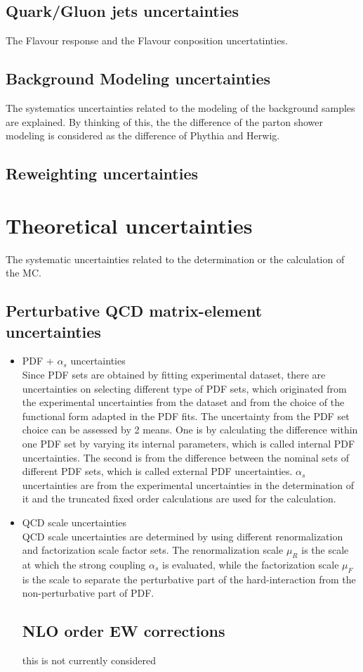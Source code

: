 \subsection{Quark/Gluon jets uncertainties}
The Flavour response and the Flavour conposition uncertatinties.
\subsection{Background Modeling uncertainties}
The systematics uncertainties related to the modeling of the background samples are explained.
By thinking of this, the the difference of the parton shower modeling is considered as the difference of Phythia and Herwig.
\subsection{Reweighting uncertainties}

\section{Theoretical uncertainties}
The systematic uncertainties related to the determination or the calculation of the MC.

\subsection{Perturbative QCD matrix-element uncertainties}
\begin{itemize}
\item PDF + $\alpha_s$ uncertainties\\
Since PDF sets are obtained by fitting experimental dataset, there are uncertainties on selecting different type of PDF sets, which originated from the experimental uncertainties from the dataset and from the choice of the functional form adapted in the PDF fits.
The uncertainty from the PDF set choice can be assessed by 2 means. One is by calculating the difference within one PDF set by varying its internal parameters, which is called internal PDF uncertainties. The second is from the difference between the nominal sets of different PDF sets, which is called external PDF uncertainties.
$\alpha_s$ uncertainties are from the experimental uncertainties in the determination of it and the truncated fixed order calculations are used for the calculation.
\item QCD scale uncertainties\\
QCD scale uncertainties are determined by using different renormalization and factorization scale factor sets. 
The renormalization scale $\mu_R$ is the scale at which the strong coupling $\alpha_s$ is evaluated, while the factorization scale $\mu_F$ is the scale to separate the perturbative part of the hard-interaction from the non-perturbative part of PDF. 


\subsection{NLO order EW corrections}
\color{blue}
this is not currently considered
\end{itemize}

